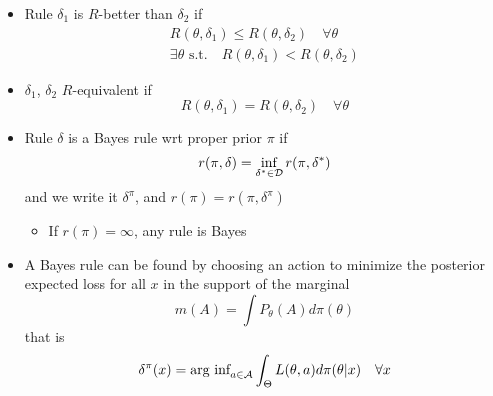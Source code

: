 \documentclass[fontsize=5pt]{scrartcl}
\begin{document}
\begin{multicols}{2}
\begin{itemize}
\item Rule $\delta_{1}$ is $R$-better than $\delta_{2}$ if
  \begin{gather}
    R(\theta,\delta_{1})\leq R(\theta,\delta_{2}) \quad \forall \theta \\
    \exists\theta \text{ s.t.} \quad R(\theta,\delta_{1})<R(\theta,\delta_{2})
  \end{gather}
\item $\delta_{1}$, $\delta_{2}$ $R$-equivalent if
  \begin{equation}
    R(\theta,\delta_{1}) = R(\theta,\delta_{2})\quad\forall\theta
  \end{equation}
\item Rule $\delta$ is a Bayes rule wrt proper prior $\pi$ if
  \begin{equation}
    r(\pi,\delta) = \inf_{\delta^{*}\in{\cal D}}r(\pi,\delta^{*})
  \end{equation} and we write it $\delta^{\pi}$, and $r(\pi)=r(\pi,\delta^{\pi})$
  \begin{itemize}
  \item If $r(\pi)=\infty$, any rule is Bayes
  \end{itemize}
\item A Bayes rule can be found by choosing an action to minimize the
  posterior expected loss for all $x$ in the support of the marginal
  \begin{equation}
    m(A) = \int P_{\theta}(A)d\pi(\theta)
  \end{equation}
  that is
  \begin{equation}
    \delta^{\pi}(x) = \text{arg inf}_{a\in{\cal A}}\int_{\Theta}
    L(\theta,a)d\pi(\theta|x)\quad \forall x
  \end{equation}


\end{itemize}
\end{multicols}
\end{document}
